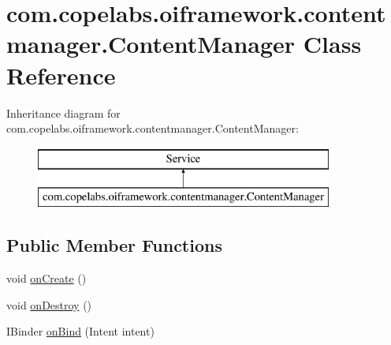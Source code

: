 \hypertarget{classcom_1_1copelabs_1_1oiframework_1_1contentmanager_1_1_content_manager}{}\section{com.\+copelabs.\+oiframework.\+contentmanager.\+Content\+Manager Class Reference}
\label{classcom_1_1copelabs_1_1oiframework_1_1contentmanager_1_1_content_manager}
Inheritance diagram for com.\+copelabs.\+oiframework.\+contentmanager.\+Content\+Manager\+:\begin{figure}[H]
\begin{center}
\leavevmode
\includegraphics[height=2.000000cm]{classcom_1_1copelabs_1_1oiframework_1_1contentmanager_1_1_content_manager}
\end{center}
\end{figure}
\subsection*{Public Member Functions}
\begin{DoxyCompactItemize}
\item 
void \hyperlink{classcom_1_1copelabs_1_1oiframework_1_1contentmanager_1_1_content_manager_a82247d9b6404ed835f30322e4d9d555c}{on\+Create} ()
\item 
void \hyperlink{classcom_1_1copelabs_1_1oiframework_1_1contentmanager_1_1_content_manager_a044b9fff26d4a9ad967cbacd0ac967bd}{on\+Destroy} ()
\item 
I\+Binder \hyperlink{classcom_1_1copelabs_1_1oiframework_1_1contentmanager_1_1_content_manager_a4f0e6894e934e8f67a51f311af90ee19}{on\+Bind} (Intent intent)
\end{DoxyCompactItemize}
